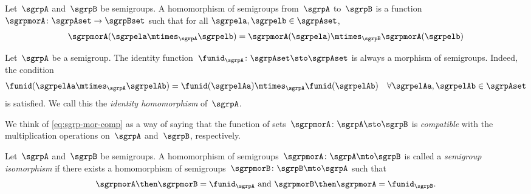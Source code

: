 

\section{\wHomos}

\begin{ctdefinition}
  \label{def:semigroup-mor}
  Let~$\sgrpA$ and~$\sgrpB$ be semigroups. A homomorphism of semigroups from~$\sgrpA$ to~$\sgrpB$ is a function~$\sgrpmorA\colon \sgrpAset \to \sgrpBset$ such that for all $\sgrpela, \sgrpelb \in \sgrpAset$,
  \begin{equation}
    \label{eq:sgrp-mor-comp}
    \sgrpmorA(\sgrpela \mtimes_{\sgrpA} \sgrpelb) = \sgrpmorA (\sgrpela) \mtimes_{\sgrpB} \sgrpmorA(\sgrpelb)
  \end{equation}

\end{ctdefinition}


\begin{definition}
  \label{def:identity-sgrp-mor}
  Let~$\sgrpA$ be a semigroup.
  The identity function~$\funid_\sgrpA\colon \sgrpAset \sto \sgrpAset$ is always a morphism of semigroups.
  Indeed, the condition
  \begin{equation}
    \funid (\sgrpelAa \mtimes_{\sgrpA} \sgrpelAb) = \funid (\sgrpelAa) \mtimes_{\sgrpA} \funid(\sgrpelAb) \quad \forall \sgrpelAa, \sgrpelAb \in \sgrpAset
  \end{equation}
  is satisfied. We call this the \emph{identity homomorphism} of~$\sgrpA$.
\end{definition}


We think of   \cref{eq:sgrp-mor-comp} as a way of saying that the function of sets~$\sgrpmorA\colon \sgrpA \sto \sgrpB$  is \emph{compatible} with the multiplication operations on~$\sgrpA$ and~$\sgrpB$, respectively.

\begin{definition}
  \label{def:semigroup-iso}
  Let~$\sgrpA$ and~$\sgrpB$ be semigroups.
  A homomorphism of semigroups~$\sgrpmorA\colon \sgrpA \mto \sgrpB$ is called a \emph{semigroup isomorphism} if there exists a homomorphism of semigroups~$\sgrpmorB\colon \sgrpB \mto \sgrpA$ such that
  \begin{equation}
    \label{eq:sgrp-iso-cond}
    \sgrpmorA \then \sgrpmorB = \funid_\sgrpA \text{ and }  \sgrpmorB \then \sgrpmorA = \funid_\sgrpB.
  \end{equation}
\end{definition}


